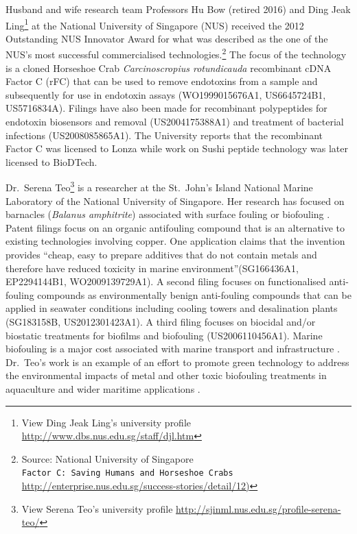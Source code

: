 \documentclass[openany]{book}
\let\rmarkdownfootnote\footnote%
\def\footnote{\protect\rmarkdownfootnote}
\theoremstyle{definition}
\theoremstyle{definition}
\theoremstyle{definition}
\theoremstyle{remark}
\begin{document}
Husband and wife research team Professors Hu Bow (retired 2016) and Ding
Jeak Ling\footnote{View Ding Jeak Ling's university profile
  \url{http://www.dbs.nus.edu.sg/staff/djl.htm}} at the National
University of Singapore (NUS) received the 2012 Outstanding NUS
Innovator Award for what was described as the one of the NUS's most
successful commercialised technologies.\footnote{Source: National
  University of Singapore
  \texttt{Factor\ C:\ Saving\ Humans\ and\ Horseshoe\ Crabs}
  \href{http://enterprise.nus.edu.sg/success-stories/detail/12}{http://enterprise.nus.edu.sg/success-stories/detail/12)}}
The focus of the technology is a cloned Horseshoe Crab
\emph{Carcinoscropius rotundicauda} recombinant cDNA Factor C (rFC) that
can be used to remove endotoxins from a sample and subsequently for use
in endotoxin assays (WO1999015676A1, US6645724B1, US5716834A). Filings
have also been made for recombinant polypeptides for endotoxin
biosensors and removal (US2004175388A1) and treatment of bacterial
infections (US2008085865A1). The University reports that the recombinant
Factor C was licensed to Lonza while work on Sushi peptide technology
was later licensed to BioDTech.

Dr.~Serena Teo\footnote{View Serena Teo's university profile
  \url{http://sjinml.nus.edu.sg/profile-serena-teo/}} is a researcher at
the St.~John's Island National Marine Laboratory of the National
University of Singapore. Her research has focused on barnacles
(\emph{Balanus amphitrite}) associated with surface fouling or
biofouling \citep{Phang_2009, Guo_2011, Petrone_2013}. Patent filings
focus on an organic antifouling compound that is an alternative to
existing technologies involving copper. One application claims that the
invention provides ``cheap, easy to prepare additives that do not
contain metals and therefore have reduced toxicity in marine
environment''(SG166436A1, EP2294144B1, WO2009139729A1). A second filing
focuses on functionalised anti-fouling compounds as environmentally
benign anti-fouling compounds that can be applied in seawater conditions
including cooling towers and desalination plants (SG183158B,
US2012301423A1). A third filing focuses on biocidal and/or biostatic
treatments for biofilms and biofouling (US2006110456A1). Marine
biofouling is a major cost associated with marine transport and
infrastructure \citep{Callow_2011}. Dr.~Teo's work is an example of an
effort to promote green technology to address the environmental impacts
of metal and other toxic biofouling treatments in aquaculture and wider
maritime applications \citep{Callow_2011, Floerl_2016}.
\end{document}
